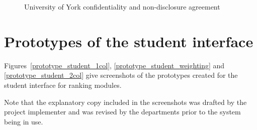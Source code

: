 \documentclass[draft]{scrartcl}
\let\stdsection\section
\renewcommand\section{\clearpage\stdsection}
\begin{document}
\begin{figure}
  \begin{center}
  \end{center}
  \caption{University of York confidentiality and non-disclosure agreement}
  \label{confidentialitynda}
\end{figure}

\stdsection{Prototypes of the student interface}
\label{sec:prototypes}

Figures~\ref{prototype_student_1col}, \ref{prototype_student_weighting} and
\ref{prototype_student_2col} give screenshots of the prototypes created for
the student interface for ranking modules.

Note that the explanatory copy included in the screenshots was drafted
by the project implementer and was revised by the departments prior to the
system being in use.
\end{document}
